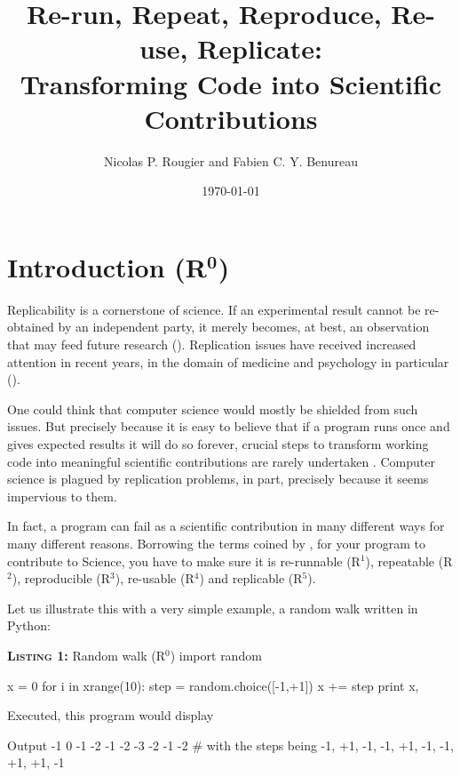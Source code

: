 \documentclass[a4paper,11pt]{article}
\title{Re-run, Repeat, Reproduce, Re-use, Replicate:\\Transforming Code into Scientific Contributions}
\author{Nicolas P. Rougier and Fabien C. Y. Benureau}
\date{\today}
\begin{document}
\maketitle
\section*{Introduction (R$^{\mathbf 0}$)}

Replicability is a cornerstone of science. 
If an experimental result cannot be re-obtained by an independent party,
it merely becomes, at best, an observation that
may feed future research (\cite{Mesirov:2010,osc:2015}). 
Replication issues have received increased attention in recent years,
in the domain of medicine and psychology in particular (\cite{Iqbal:2016}).

One could think that computer science would mostly be shielded from such issues.
But precisely because it is easy to believe that
if a program runs once and gives expected results it will do so forever, 
crucial steps to transform working code into meaningful scientific contributions are rarely undertaken \citep{Sandve:2013,Schwab:2000}. 
Computer science is plagued by replication problems,
in part, precisely because it seems impervious to them.

In fact, a program can fail as a scientific contribution
in many different ways for many different reasons.
Borrowing the terms coined by \citeauthor{Goble:2016} \citep{Goble:2016},
for your program to contribute to Science,
you have to make sure it is
re-runnable (R$^1$),
repeatable (R$^2$),
reproducible (R$^3$),
re-usable (R$^4$)
and replicable (R$^5$).

Let us illustrate this with a very simple example,
a random walk written in Python:

\begin{code}{\textbf{\textsc{Listing 1:}} Random walk (R$^0$)}
import random

x = 0
for i in xrange(10):
    step = random.choice([-1,+1])
    x += step
    print x,
\end{code}

Executed, this program would display 
\begin{code}{Output}
-1  0 -1 -2 -1 -2 -3 -2 -1 -2 # with the steps being -1, +1, -1, -1, +1, -1, -1, +1, +1, -1
\end{code}
\end{document}
